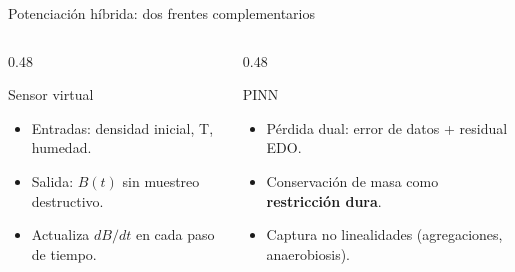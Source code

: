 \documentclass[aspectratio=169, 11pt]{beamer}
\begin{document}
\begin{frame}{Potenciaci\'{o}n h\'{i}brida: dos frentes complementarios}
    \begin{center}
    \end{center}

    \vfill
    \begin{columns}[T]
        \begin{column}{0.48\textwidth}
            \begin{block}{Sensor virtual}
                \begin{itemize}
                    \item Entradas: densidad inicial, T, humedad.
                    \item Salida: $B(t)$ sin muestreo destructivo.
                    \item Actualiza $dB/dt$ en cada paso de tiempo.
                \end{itemize}
            \end{block}
        \end{column}
        \begin{column}{0.48\textwidth}
            \begin{block}{PINN}
                \begin{itemize}
                    \item P\'{e}rdida dual: error de datos + residual EDO.
                    \item Conservaci\'{o}n de masa como \textbf{restricci\'{o}n dura}.
                    \item Captura no linealidades (agregaciones, anaerobiosis).
                \end{itemize}
            \end{block}
        \end{column}
    \end{columns}
\end{frame}
\end{document}
